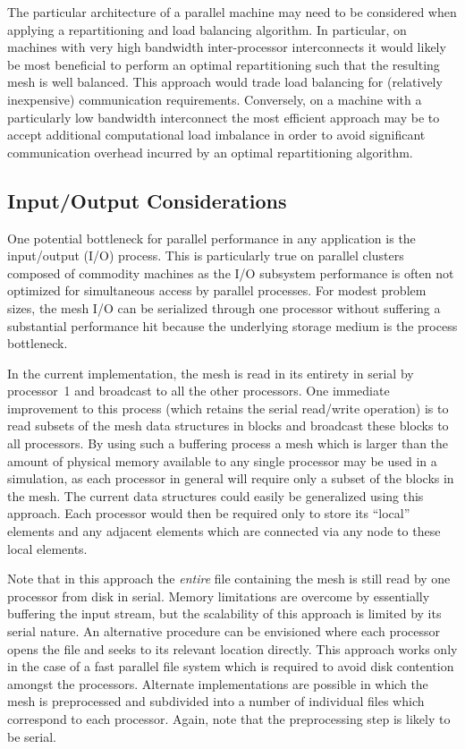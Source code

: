 The particular architecture of a parallel machine may need to be considered when applying a repartitioning and load balancing algorithm.  In particular, on machines with very high bandwidth inter-processor interconnects it would likely be most beneficial to perform an optimal repartitioning such that the resulting mesh is well balanced.  This approach would trade load balancing for (relatively inexpensive) communication requirements.  Conversely, on a machine with a particularly low bandwidth interconnect the most efficient approach may be to accept additional computational load imbalance in order to avoid significant communication overhead incurred by an optimal repartitioning algorithm.

\subsection{Input/Output Considerations}
One potential bottleneck for parallel performance in any application is the input/output (I/O) process.  This is particularly true on parallel clusters composed of commodity machines as the I/O subsystem performance is often not optimized for simultaneous access by parallel processes. For modest problem sizes, the mesh I/O can be serialized through one processor without suffering a substantial performance hit because the underlying storage medium is the process bottleneck.

In the current implementation, the mesh is read in its entirety in serial by processor~1 and broadcast to all the other processors.  One immediate improvement to this process (which retains the serial read/write operation) is to read subsets of the mesh data structures in blocks and broadcast these blocks to all processors.  By using such a buffering process a mesh which is larger than the amount of physical memory available to any single processor may be used in a simulation, as each processor in general will require only a subset of the blocks in the mesh.  The current data structures could easily be generalized using this approach.  Each processor would then be required only to store its ``local'' elements and any adjacent elements which are connected via any node to these local elements.

Note that in this approach the \emph{entire} file containing the mesh is still read by one processor from disk in serial.  Memory limitations are overcome by essentially buffering the input stream, but the scalability of this approach is limited by its serial nature. An alternative procedure can be envisioned where each processor opens the file and seeks to its relevant location directly.  This approach works only in the case of a fast parallel file system which is required to avoid disk contention amongst the processors.  Alternate implementations are possible in which the mesh is preprocessed and subdivided into a number of individual files which correspond to each processor.  Again, note that the preprocessing step is likely to be serial.

